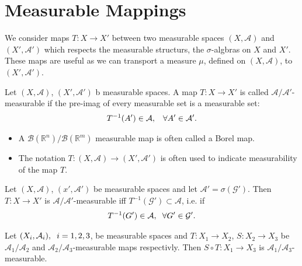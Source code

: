 \section{Measurable Mappings}

    We consider maps $T:X\rightarrow X'$ between two measurable spaces $(X,\mathcal A)$ and $(X',\mathcal A')$ which respects the measurable 
    structurs, the $\sigma$-algbras on $X$ and $X'$. These maps are useful as we can transport a measure $\mu$, defined on $(X,\mathcal A)$, to $(X',\mathcal A')$.

    

    \begin{definition}
        Let $(X,\mathcal A)$, $(X',\mathcal A')$ b measurable spaces. A map $T:X\rightarrow X'$ is called $\mathcal A/\mathcal A'$-measurable if the pre-imag of every measurable set is a measurable set: 
        \begin{align}
        T^{-1}(A')\in \mathcal A,\hspace{3mm} \forall A'\in\mathcal A'.    
        \end{align}

    \end{definition}
    \begin{itemize}
        \item A $\mathcal B(\mathbb R^n)/\mathcal B(\mathbb R^m)$ measurable map is often called a Borel map. 
        \item The notation $T:(X,\mathcal A)\rightarrow (X',\mathcal A')$ is often used to indicate measurability of the map $T$.
    \end{itemize}

    \begin{lemma}
        Let $(X,\mathcal A)$, $(x',\mathcal A')$ be measurable spaces and let $\mathcal A' = \sigma(\mathcal G')$. Then $T:X\rightarrow X'$ is $\mathcal A/\mathcal A'$-measurable iff $T^{-1}(\mathcal G')\subset \mathcal A$, i.e. if 
        \begin{align}
            T^{-1}(G')\in\mathcal A,\hspace{2mm} \forall G'\in\mathcal G'.
        \end{align} 
    \end{lemma}


	\begin{theorem}

        Let $(X_i,\mathcal A_i),\hspace{2mm}i=1,2,3$, be measurable spaces and $T:X_1\rightarrow X_2$, $S:X_2\rightarrow X_3$ be $\mathcal A_1/\mathcal A_2$ and $\mathcal A_2/\mathcal A_3$-measurable maps respectivly. Then $S\circ T:X_1\rightarrow X_3$ is $\mathcal A_1/\mathcal A_3$-measurable. 

	\end{theorem}

